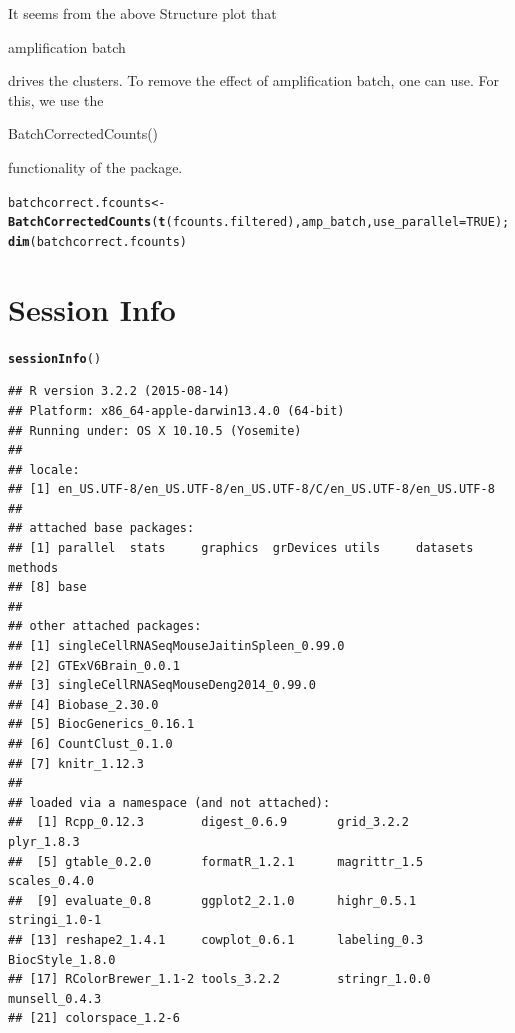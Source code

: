 \documentclass[12pt]{article}\usepackage[]{graphicx}\usepackage[usenames,dvipsnames]{color}
\makeatletter
\newcommand{\hlnum}[1]{\textcolor[rgb]{0.686,0.059,0.569}{#1}}%
\newcommand{\hlstd}[1]{\textcolor[rgb]{0.345,0.345,0.345}{#1}}%
\newcommand{\hlkwb}[1]{\textcolor[rgb]{0.69,0.353,0.396}{#1}}%
\newcommand{\hlkwc}[1]{\textcolor[rgb]{0.333,0.667,0.333}{#1}}%
\newcommand{\hlkwd}[1]{\textcolor[rgb]{0.737,0.353,0.396}{\textbf{#1}}}%
\newenvironment{kframe}{%
 \def\at@end@of@kframe{}%
 \ifinner\ifhmode%
  \def\at@end@of@kframe{\end{minipage}}%
  \begin{minipage}{\columnwidth}%
 \fi\fi%
 \def\FrameCommand##1{\hskip\@totalleftmargin \hskip-\fboxsep
 \colorbox{shadecolor}{##1}\hskip-\fboxsep
     \hskip-\linewidth \hskip-\@totalleftmargin \hskip\columnwidth}%
 \MakeFramed {\advance\hsize-\width
   \@totalleftmargin\z@ \linewidth\hsize
   \@setminipage}}%
 {\par\unskip\endMakeFramed%
 \at@end@of@kframe}
\newenvironment{knitrout}{}{} %
\makeatother
\begin{document}
It seems from the above Structure plot that \begin{verb} amplification batch \end{verb} drives the clusters. To remove the effect of amplification batch, one can use. For this, we use the \begin{verb} BatchCorrectedCounts() \end{verb} functionality of the package.

\clearpage

\begin{knitrout}
\color{fgcolor}\begin{kframe}
\begin{alltt}
\hlstd{batchcorrect.fcounts} \hlkwb{<-} \hlkwd{BatchCorrectedCounts}\hlstd{(}\hlkwd{t}\hlstd{(fcounts.filtered), amp_batch,} \hlkwc{use_parallel} \hlstd{=} \hlnum{TRUE}\hlstd{);}
\hlkwd{dim}\hlstd{(batchcorrect.fcounts)}
\end{alltt}
\end{kframe}
\end{knitrout}


\section{Session Info}

\begin{knitrout}
\color{fgcolor}\begin{kframe}
\begin{alltt}
\hlkwd{sessionInfo}\hlstd{()}
\end{alltt}
\begin{verbatim}
## R version 3.2.2 (2015-08-14)
## Platform: x86_64-apple-darwin13.4.0 (64-bit)
## Running under: OS X 10.10.5 (Yosemite)
## 
## locale:
## [1] en_US.UTF-8/en_US.UTF-8/en_US.UTF-8/C/en_US.UTF-8/en_US.UTF-8
## 
## attached base packages:
## [1] parallel  stats     graphics  grDevices utils     datasets  methods  
## [8] base     
## 
## other attached packages:
## [1] singleCellRNASeqMouseJaitinSpleen_0.99.0
## [2] GTExV6Brain_0.0.1                       
## [3] singleCellRNASeqMouseDeng2014_0.99.0    
## [4] Biobase_2.30.0                          
## [5] BiocGenerics_0.16.1                     
## [6] CountClust_0.1.0                        
## [7] knitr_1.12.3                            
## 
## loaded via a namespace (and not attached):
##  [1] Rcpp_0.12.3        digest_0.6.9       grid_3.2.2         plyr_1.8.3        
##  [5] gtable_0.2.0       formatR_1.2.1      magrittr_1.5       scales_0.4.0      
##  [9] evaluate_0.8       ggplot2_2.1.0      highr_0.5.1        stringi_1.0-1     
## [13] reshape2_1.4.1     cowplot_0.6.1      labeling_0.3       BiocStyle_1.8.0   
## [17] RColorBrewer_1.1-2 tools_3.2.2        stringr_1.0.0      munsell_0.4.3     
## [21] colorspace_1.2-6
\end{verbatim}
\end{kframe}
\end{knitrout}
\end{document}
